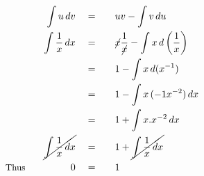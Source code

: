 \begin{alignat*}{5}
&\,&\int u\,dv\quad&=\quad&&uv-\int v\,du\\
&\,&\int\frac{1}{x}\,dx\quad&=&&\cancel{x}\frac{1}{\cancel{x}}-\int x\,d\left(\frac{1}{x}\right)\\
&\,&\,&=&&1-\int x\,d(x^{-1})\\
&\,&\,&=&&1-\int x\,(-1x^{-2})\,dx\\
&\,&\,&=&&1+\int x.x^{-2}\,dx\\
&\,&\cancel{\int\frac{1}{x}\,dx}\quad&=&&1+\cancel{\int\frac{1}{x}\,dx}\\
&\small\text{Thus}\quad&0\quad&=&&1
\end{alignat*}
